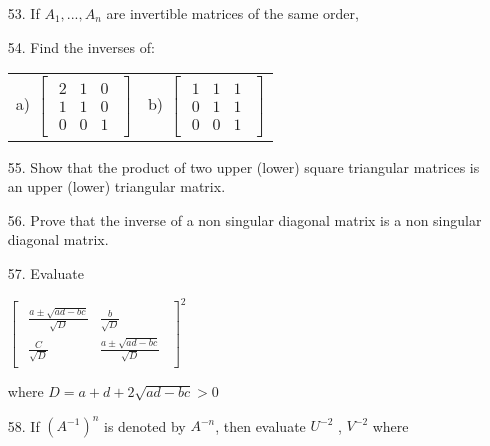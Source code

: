 \documentclass[11pt]{amsbook}
\begin{document}
\begin{enumerate}
	\item[53.]
	If $A_1, ... , A_n$ are invertible matrices of the same order,
	\item[54.]
	Find the inverses of:
	
	\begin{tabular}{ll}
		a) 
		$
		\begin{bmatrix}
		{\begin{array}{ccc}
   		2 & 1 & 0\\
		1 & 1 & 0\\
		0 & 0 & 1     \end{array} }
		\end{bmatrix}
		$
		&b)
		$
		\begin{bmatrix}
		{\begin{array}{ccc}
   		1 & 1 & 1\\
		0 & 1 & 1\\
		0 & 0 & 1     \end{array} }
		\end{bmatrix}
		$
	\end{tabular}
	\item[55.]
	Show that the product of two upper (lower) square triangular matrices is an upper (lower) triangular matrix.
	\item[56.]
	Prove that the inverse of a non singular diagonal matrix is a non singular diagonal matrix.
	\item[57.]
	Evaluate
	\begin{center}
		$
		\begin{bmatrix}
		{\begin{array}{cc}
	   	\frac{a \pm \sqrt{ad-bc}}{\sqrt{D}}& \frac{b}{\sqrt{D}} \\
		\frac{C}{\sqrt{D}} & \frac{a \pm \sqrt{ad-bc}}{\sqrt{D}}     \end{array}}
		\end{bmatrix}^2
		$
	\end{center}
	where $D = a + d + 2\sqrt{ad-bc}>0$
	\item[58.]
	If $(A^{-1})^n$ is denoted by $A^{-n}$, then evaluate $U^{-2}$ , $V^{-2}$ where
	

\end{enumerate}
\end{document}
